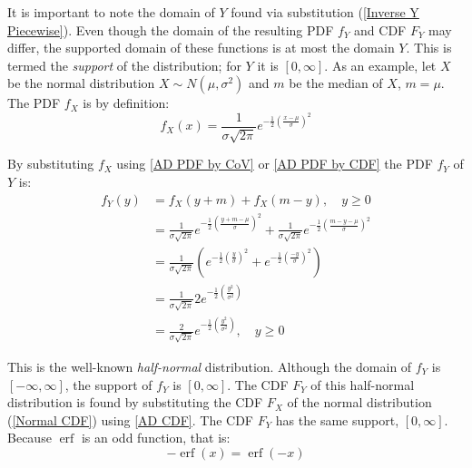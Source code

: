 \documentclass{article}
\DeclareMathOperator\erf{erf}
\begin{document}
It is important to note the domain of $Y$ found via substitution (\ref{Inverse Y Piecewise}). Even though the domain of the resulting PDF $f_Y$ and CDF $F_Y$ may differ, the supported domain of these functions is at most the domain $Y$. This is termed the \emph{support} of the distribution; for $Y$ it is $[0,\infty]$. As an example, let $X$ be the normal distribution $X \sim N(\mu, \sigma^2)$ and $m$ be the median of $X$, $m = \mu$. The PDF $f_X$ is by definition:
%
\begin{equation}\label{Normal PDF}
f_X(x) = \frac{1}{\sigma \sqrt{2 \pi}}
    e^{-\frac{1}{2} \left( \frac{x - \mu}{\sigma} \right)^2}
\end{equation}

By substituting $f_X$ using \ref{AD PDF by CoV} or \ref{AD PDF by CDF} the PDF $f_Y$ of $Y$ is:
%
\begin{equation}\label{PDF of Half-Normal}
\begin{split}
f_Y(y) &= f_X(y+m) + f_X(m-y)
    , \quad y \geq 0 \\
&=  \frac{1}{\sigma \sqrt{2 \pi}}
    e^{-\frac{1}{2} \left( \frac{y + m - \mu}{\sigma} \right)^2}
    + \frac{1}{\sigma \sqrt{2 \pi}}
    e^{-\frac{1}{2} \left( \frac{m - y - \mu}{\sigma} \right)^2} \\
&=  \frac{1}{\sigma \sqrt{2 \pi}} \left(
    e^{-\frac{1}{2} \left( \frac{y}{\sigma} \right)^2} +
    e^{-\frac{1}{2} \left( \frac{- y}{\sigma} \right)^2}
    \right) \\
&=  \frac{1}{\sigma \sqrt{2 \pi}}
    2e^{-\frac{1}{2} \left( \frac{y^2}{\sigma^2} \right)} \\
&=  \frac{2}{\sigma \sqrt{2 \pi}}
    e^{-\frac{1}{2} \left( \frac{y^2}{\sigma^2} \right)}
    , \quad y \geq 0
\end{split}
\end{equation}

This is the well-known \emph{half-normal} distribution. Although the domain of $f_Y$ is $[-\infty,\infty]$, the support of $f_Y$ is $[0,\infty]$. The CDF $F_Y$ of this half-normal distribution is found by substituting the CDF $F_X$ of the normal distribution (\ref{Normal CDF}) using \ref{AD CDF}. The CDF $F_Y$ has the same support, $[0,\infty]$. Because $\erf$ is an odd function, that is:
%
\begin{equation}\label{ERF Odd}
-\erf(x) = \erf(-x)
\end{equation}
\end{document}
